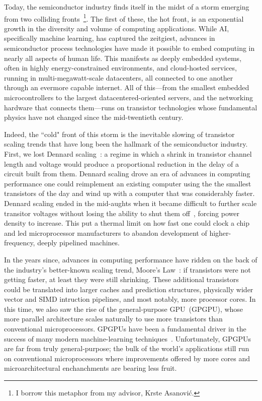 Today, the semiconductor industry finds itself in the midst of a storm emerging
from two colliding fronts~\footnote{I borrow this metaphor from my advisor,
Krste Asanovi\'c.}. The first
of these, the hot front, is an exponential growth in the diversity and volume
of computing applications.  While AI, specifically machine
learning, has captured the zeitgiest, advances in semiconductor process
technologies have made it possible to embed computing in nearly all aspects of
human life. This manifests as deeply embedded systems, often in highly
energy-constrained environments, and cloud-hosted services, running in
multi-megawatt-scale datacenters, all connected to one another through an evermore capable internet.  All of
this---from the smallest embedded microcontrollers to the largest
datacentered-oriented servers, and the networking hardware that connects
them---runs on transistor technologies whose fundamental physics have not
changed since the mid-twentieth century.

Indeed, the ``cold" front of this storm is the inevitable slowing of transistor
scaling trends that have long been the hallmark of the semiconductor industry.
First, we lost Dennard scaling~\cite{DennardScaling}: a regime in which a
shrink in transistor channel length and voltage would produce a proportional
reduction in the delay of a circuit built from them.  Dennard scaling drove an
era of advances in computing performance one could reimplement an existing
computer using the the smallest transistors of the day and wind up with a
computer that was considerably faster. Dennard scaling ended in the mid-aughts
when it became difficult to further  scale transitor voltages without losing
the ability to shut them off~\cite{ScalingChallenges}, forcing power density to
increase. This put a thermal limit on how fast one could clock a chip
and led microprocessor manufacturers to abandon development of
higher-frequency, deeply pipelined machines.

In the years since, advances in computing performance have ridden on the back
of the industry's better-known scaling trend, Moore's Law~\cite{MooresLaw}: if
transistors were not getting faster, at least they were still shrinking. These
additional transistors could be translated into larger caches and prediction
structures, physically wider vector and SIMD intruction pipelines, and most
notably, more processor cores. In this time, we also saw the rise of the general-purpose
GPU~(GPGPU), whose more parallel architecture scales naturally to use
more transistors than conventional microprocessors. GPGPUs have been
a fundamental driver in the success of many modern machine-learning
techniques~\cite{AlexNet}.  Unfortunately, GPGPUs are far from truly
general-purpose; the bulk of the world's applications still run on conventional
microprocessors where improvements offered by more cores and
microarchitectural enchanchments are bearing less fruit.


